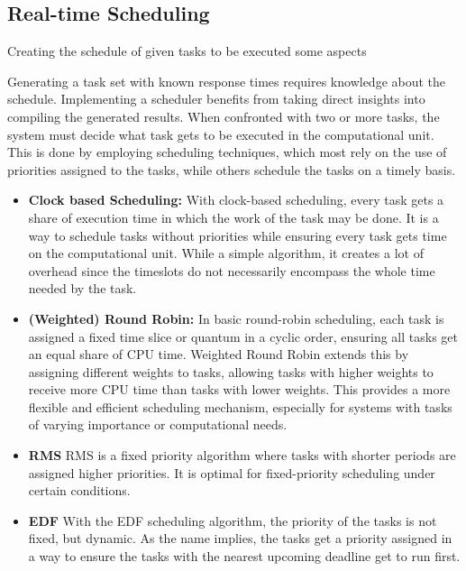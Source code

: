 \subsection{Real-time Scheduling}\label{sec:scheduling}
Creating the schedule of given tasks to be executed some aspects

Generating a task set with known response times requires knowledge about the schedule. Implementing a scheduler benefits from taking direct insights into compiling the generated results.
When confronted with two or more tasks, the system must decide what task gets to be executed in the computational unit.
This is done by employing scheduling techniques, which most rely on the use of priorities assigned to the tasks, while others schedule the tasks on a timely basis.

\begin{itemize}
	\item \textbf{Clock based Scheduling:}
	      With clock-based scheduling, every task gets a share of execution time in which the work of the task may be done. It is a way to schedule tasks without priorities while ensuring every task gets time on the computational unit. While a simple algorithm, it creates a lot of overhead since the timeslots do not necessarily encompass the whole time needed by the task.
	\item \textbf{(Weighted) Round Robin:}
	      In basic round-robin scheduling, each task is assigned a fixed time slice or quantum in a cyclic order, ensuring all tasks get an equal share of CPU time. Weighted Round Robin extends this by assigning different weights to tasks, allowing tasks with higher weights to receive more CPU time than tasks with lower weights. This provides a more flexible and efficient scheduling mechanism, especially for systems with tasks of varying importance or computational needs. \cite{helmyOptimizingRoundRobinScheduling2024}
	\item \textbf{\ac{RMS}}
	      \ac{RMS} is a fixed priority algorithm where tasks with shorter periods are assigned higher priorities.
	      It is optimal for fixed-priority scheduling under certain conditions. \cite{lehoczkyRateMonotonicScheduling1989}
	\item \textbf{\ac{EDF}}
	      With the \ac{EDF} scheduling algorithm, the priority of the tasks is not fixed, but dynamic.
	      As the name implies, the tasks get a priority assigned in a way to ensure the tasks with the nearest upcoming deadline get to run first.\cite{lehoczkyPerformanceRealtimeBus1986}
\end{itemize}

